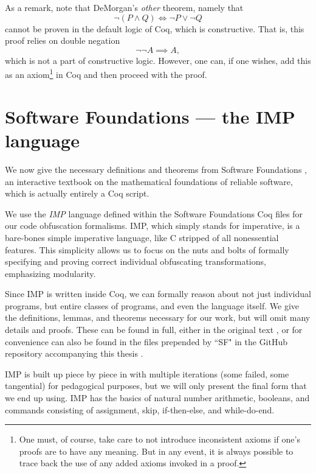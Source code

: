 \documentclass[12pt,notitlepage]{report}
\theoremstyle{plain}
\theoremstyle{definition}
\newcommand{\define}[1]{\emph{#1}\index{#1}}
\numberwithin{equation}{section}
\begin{document}
\par As a remark, note that DeMorgan's \emph{other} theorem, namely that 
\[
    \neg (P \land Q) \Longleftrightarrow \neg P \lor \neg Q
\]
cannot be proven in the default logic of Coq, which is constructive.  That is, this proof relies on double negation
\[
    \neg\neg A \implies A,
\]
which is not a part of constructive logic.  However, one can, if one wishes, add this as an axiom\footnote{One must, of course, take care to not introduce inconsistent axioms if one's proofs are to have any meaning.  But in any event, it is always possible to trace back the use of any added axioms invoked in a proof.} in Coq and then proceed with the proof.

\section{Software Foundations --- the IMP language}
We now give the necessary definitions and theorems from Software Foundations \cite{Pier}, an interactive textbook on the mathematical foundations of reliable software, which is actually entirely a Coq script.

\par We use the \define{IMP} language defined within the Software Foundations Coq files for our code obfuscation formalisms.  IMP, which simply stands for imperative, is a bare-bones simple imperative language, like C stripped of all nonessential features.  This simplicity allows us to focus on the nuts and bolts of formally specifying and proving correct individual obfuscating transformations, emphasizing modularity.

\par Since IMP is written inside Coq, we can formally reason about not just individual programs, but entire classes of programs, and even the language itself.  We give the definitions, lemmas, and theorems necessary for our work, but will omit many details and proofs.  These can be found in full, either in the original text \cite{Pier}, or for convenience can also be found in the files prepended by ``SF" in the GitHub repository accompanying this thesis \cite{repo}.

\par IMP is built up piece by piece in \cite{Pier} with multiple iterations (some failed, some tangential) for pedagogical purposes, but we will only present the final form that we end up using.  IMP has the basics of natural number arithmetic, booleans, and commands consisting of assignment, skip, if-then-else, and while-do-end.
\end{document}
